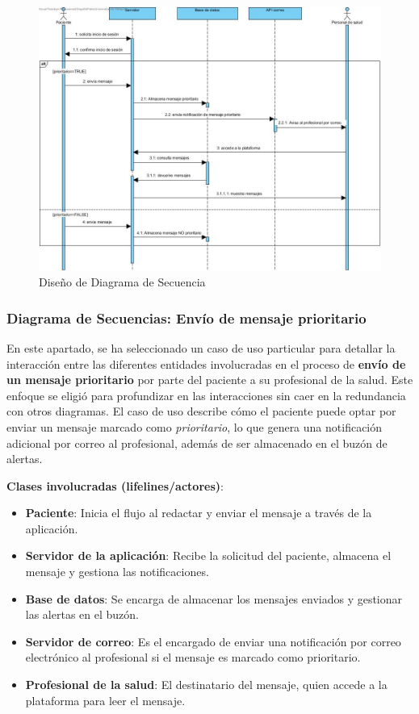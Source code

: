 \documentclass{article}
\begin{document}
\begin{figure}[h!]
	\begin{center} 
		\includegraphics[width=1\textwidth]{images/Diagrama_de_secuencia_rehabilitacion.jpg}
		\caption{Diseño de Diagrama de Secuencia}
		\label{fig:secuencia_diagrama}
	\end{center}
\end{figure}

\subsubsection{Diagrama de Secuencias: Envío de mensaje prioritario}

En este apartado, se ha seleccionado un caso de uso particular para detallar la interacción entre las diferentes entidades involucradas en el proceso de \textbf{envío de un mensaje prioritario} por parte del paciente a su profesional de la salud. Este enfoque se eligió para profundizar en las interacciones sin caer en la redundancia con otros diagramas. El caso de uso describe cómo el paciente puede optar por enviar un mensaje marcado como \textit{prioritario}, lo que genera una notificación adicional por correo al profesional, además de ser almacenado en el buzón de alertas.

\textbf{Clases involucradas (lifelines/actores)}:
\begin{itemize}
	\item \textbf{Paciente}: Inicia el flujo al redactar y enviar el mensaje a través de la aplicación.
	\item \textbf{Servidor de la aplicación}: Recibe la solicitud del paciente, almacena el mensaje y gestiona las notificaciones.
	\item \textbf{Base de datos}: Se encarga de almacenar los mensajes enviados y gestionar las alertas en el buzón.
	\item \textbf{Servidor de correo}: Es el encargado de enviar una notificación por correo electrónico al profesional si el mensaje es marcado como prioritario.
	\item \textbf{Profesional de la salud}: El destinatario del mensaje, quien accede a la plataforma para leer el mensaje.
\end{itemize}
\end{document}
